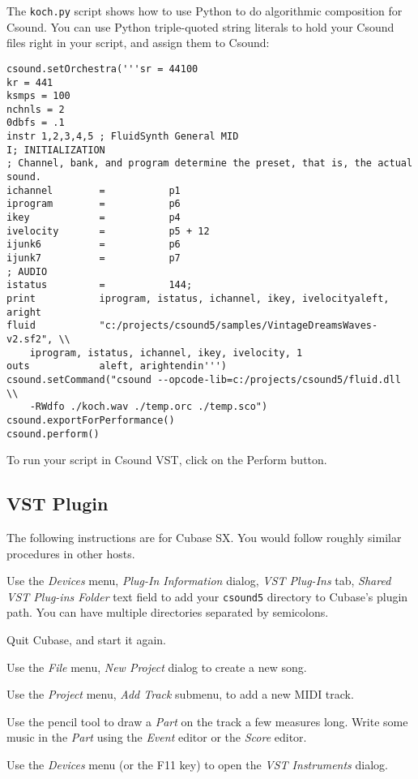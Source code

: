 \documentclass[10pt,letterpaper,onecolumn]{book}
\begin{document}
The \texttt{koch.py} script shows how to use Python to do algorithmic composition for Csound. You can use Python triple-quoted string literals to hold your Csound files right in your script, and assign them to Csound: 

\begin{lstlisting}
csound.setOrchestra('''sr = 44100
kr = 441
ksmps = 100   
nchnls = 2
0dbfs = .1
instr 1,2,3,4,5 ; FluidSynth General MID
I; INITIALIZATION
; Channel, bank, and program determine the preset, that is, the actual sound.
ichannel		=			p1
iprogram		=			p6
ikey	 		= 			p4
ivelocity 		= 			p5 + 12
ijunk6 			= 			p6
ijunk7			=			p7
; AUDIO
istatus			=			144;			
print			iprogram, istatus, ichannel, ikey, ivelocityaleft, aright		
fluid			"c:/projects/csound5/samples/VintageDreamsWaves-v2.sf2", \\
    iprogram, istatus, ichannel, ikey, ivelocity, 1			
outs 			aleft, arightendin''')
csound.setCommand("csound --opcode-lib=c:/projects/csound5/fluid.dll \\
    -RWdfo ./koch.wav ./temp.orc ./temp.sco")
csound.exportForPerformance()
csound.perform()
\end{lstlisting}

To run your script in Csound VST, click on the Perform button. 

\subsection{VST Plugin}
The following instructions are for Cubase SX. You would follow roughly similar procedures in other hosts.

Use the \emph{Devices} menu, \emph{Plug-In Information} dialog, \emph{VST Plug-Ins} tab, \emph{Shared VST Plug-ins Folder} text field to add your \texttt{csound5} directory to Cubase's plugin path. You can have multiple directories separated by semicolons. 

Quit Cubase, and start it again. 

Use the \emph{File} menu, \emph{New Project} dialog to create a new song. 

Use the \emph{Project} menu, \emph{Add Track} submenu, to add a new MIDI track. 

Use the pencil tool to draw a \emph{Part} on the track a few measures long. Write some music in the \emph{Part} using the \emph{Event} editor or the \emph{Score} editor. 

Use the \emph{Devices} menu (or the F11 key) to open the \emph{VST Instruments} dialog. 
\end{document}
